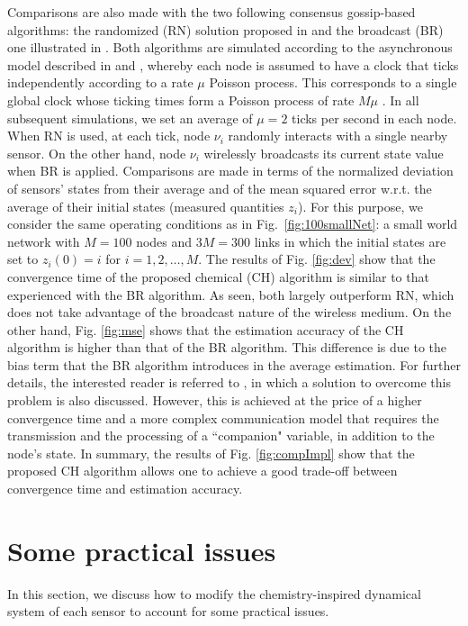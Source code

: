 \documentclass[journal]{IEEEtran}
\begin{document}
{Comparisons are also made with the two following consensus gossip-based algorithms: the randomized (RN) solution proposed in \cite{BoGh06} and the broadcast (BR) one illustrated in \cite{AyYi09}. Both algorithms are simulated according to the asynchronous model described in \cite{BoGh06} and \cite{AyYi09}, whereby each node is assumed to have a clock that ticks independently according to a rate $\mu$ Poisson process. This corresponds to a single global clock whose ticking times form a Poisson process of rate $M\mu$ \cite{AyYi09}. In all subsequent simulations, we set an average of $\mu =2$ ticks per second in each node. When RN is used, at each tick, node $\nu_i$ randomly interacts with a single nearby sensor. On the other hand, node $\nu_i$ wirelessly broadcasts its current state value when BR is applied.} {Comparisons are made in terms of the normalized deviation of sensors' states from their average and of the mean squared error w.r.t. the average of their initial states (measured quantities $z_i$). 
}
{For this purpose, we consider the same operating conditions as in Fig.~\ref{fig:100smallNet}: a small world network with $M=100$ nodes and $3M = 300$ links in which the initial states are set to $z_i(0)=i$ for $i=1,2,\ldots,M$.} {The results of Fig. \ref{fig:dev} show that the convergence time of the proposed chemical (CH) algorithm is similar to that experienced with the BR algorithm. As seen, both largely outperform RN, which does not take advantage of the broadcast nature of the wireless medium. On the other hand, Fig. \ref{fig:mse} shows that the estimation accuracy of the CH algorithm is higher than that of the BR algorithm. This difference is due to the bias term that the BR algorithm introduces in the average estimation. For further details, the interested reader is referred to \cite{ShRa13}, in which a solution to overcome this problem is also discussed. However, this is achieved at the price of a higher convergence time and a more complex communication model that requires the transmission and the processing of a ``companion" variable, in addition to the node's state.} 
{In summary, the results of Fig. \ref{fig:compImpl} show that the proposed CH algorithm allows one to achieve a good trade-off between convergence time and estimation accuracy.}




\section{Some practical issues}\label{sec:Robustness}
{
In this section, {we discuss how to modify the chemistry-inspired dynamical system} of each sensor to account for some practical issues. 
}
\end{document}
